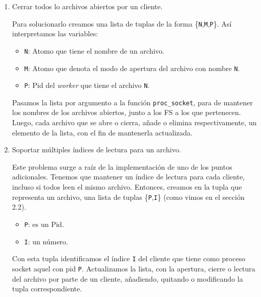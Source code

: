 \documentclass[a4paper, 8pt]{article}
\begin{document}
\begin{enumerate}
%   
%   
  \item Cerrar todos lo archivos abiertos por un cliente.
  
  Para solucionarlo creamos una lista de tuplas de la forma \{\texttt{N},\texttt{M},\texttt{P}\}. Así interpretamos las variables:
  
  \begin{itemize}
    \item \texttt{N}: Atomo que tiene el nombre de un archivo.
    \item \texttt{M}: Atomo que denota el modo de apertura del archivo con nombre \texttt{N}.
    \item \texttt{P}: Pid del \textit{worker} que tiene el archivo \texttt{N}.
  \end{itemize}
  
  Pasamos la lista por argumento a la función \texttt{proc\_socket}, para de mantener los
  nombres de los archivos abiertos, junto a los FS a los que pertenecen.
  Luego, cada archivo que se abre o cierra, añade o elimina respectivamente, un elemento de la lista, con el fin de mantenerla actualizada.
  
  \item Soportar múltiples índices de lectura para un archivo.
  
  Este problema surge a raíz de la implementación de uno de los puntos adicionales. Tenemos que mantener un índice de lectura para cada cliente,
  incluso si todos leen el mismo archivo.
  Entonces, creamos en la tupla que representa un archivo, una lista de tuplas \{\texttt{P},\texttt{I}\} (como vimos en el sección 2.2).
  
  \begin{itemize}
    \item \texttt{P}: es un Pid.
    \item \texttt{I}: un número.
  \end{itemize}
  
  Con esta tupla identificamos el índice \texttt{I} del cliente que tiene como proceso socket aquel con pid \texttt{P}.
  Actualizamos la lista, con la apertura, cierre o lectura del archivo por parte de un cliente, añadiendo, quitando o modificando la tupla correspondiente.
\end{enumerate}
\end{document}
